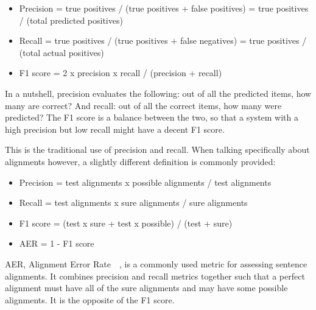 \begin{itemize}
    \item Precision =  true positives / (true positives + false positives) = true positives / (total predicted positives)
    \item Recall =  true positives / (true positives + false negatives) = true positives / (total actual positives)
    \item F1 score = 2 x precision x recall / (precision + recall)
\end{itemize}

In a nutshell, precision evaluates the following: out of all the predicted items, how many are correct? And recall: out of all the correct items, how many were predicted? The F1 score is a balance between the two, so that a system with a high precision but low recall might have a decent F1 score.

This is the traditional use of precision and recall. When talking specifically about alignments however, a slightly different definition is commonly provided:

\begin{itemize}
    \item Precision =  test alignments x possible alignments / test alignments
    \item Recall =  test alignments x sure alignments / sure alignments
    \item F1 score = (test x sure + test x possible) / (test + sure)
    \item AER = 1 - F1 score
\end{itemize}

AER, Alignment Error Rate~\cite{mihalcea2003evaluation}~\cite{koehn2009statistical}, is a commonly used metric for assessing sentence alignments. It combines precision and recall metrics together such that a perfect alignment must have all of the sure alignments and may have some possible alignments. It is the opposite of the F1 score.

